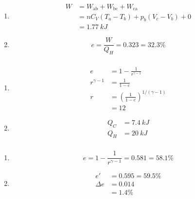 \documentclass{article}
\begin{document}
\begin{enumerate}
  \item

        \begin{align*}
          W & = W_\text{ab} + W_\text{bc} + W_\text{ca} \\
            & = n C_V (T_a - T_b) + p_b (V_c - V_b) + 0 \\
            & = \qty{1.77}{kJ}
        \end{align*}

  \item \[e = \frac{W}{Q_H} = 0.323 = 32.3\%\]
\end{enumerate}

\setcounter{subsubsection}{6}
\subsubsection{}

\begin{enumerate}
  \item

        \begin{align*}
          e              & = 1 - \frac{1}{r^{\gamma - 1}}                      \\
          r^{\gamma - 1} & = \frac{1}{1 - e}                                   \\
          r              & = \left( \frac{1}{1 - e} \right)^{1 / (\gamma - 1)} \\
                         & = 12
        \end{align*}

  \item

        \begin{align*}
          Q_C & = \qty{7.4}{kJ} \\
          Q_H & = \qty{20}{kJ}
        \end{align*}
\end{enumerate}

\setcounter{subsubsection}{8}
\subsubsection{}

\begin{enumerate}
  \item \[e = 1 - \frac{1}{r^{\gamma - 1}} = 0.581 = 58.1\%\]

  \item

        \begin{align*}
          e'       & = 0.595 = 59.5\% \\
          \Delta e & = 0.014          \\
                   & = 1.4\%
        \end{align*}
\end{enumerate}
\end{document}
